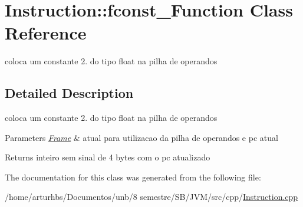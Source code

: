 \hypertarget{classInstruction_1_1fconst__2Function}{}\section{Instruction\+:\+:fconst\+\_\+Function Class Reference}
\label{classInstruction_1_1fconst__2Function}


coloca um constante 2. do tipo float na pilha de operandos  




\subsection{Detailed Description}
coloca um constante 2. do tipo float na pilha de operandos 


\begin{DoxyParams}{Parameters}
{\em \hyperlink{classFrame}{Frame}} & atual para utilizacao da pilha de operandos e pc atual \\
\hline
\end{DoxyParams}
\begin{DoxyReturn}{Returns}
inteiro sem sinal de 4 bytes com o pc atualizado 
\end{DoxyReturn}


The documentation for this class was generated from the following file\+:\begin{DoxyCompactItemize}
\item 
/home/arturhbs/\+Documentos/unb/8 semestre/\+S\+B/\+J\+V\+M/src/cpp/\hyperlink{Instruction_8cpp}{Instruction.\+cpp}\end{DoxyCompactItemize}
